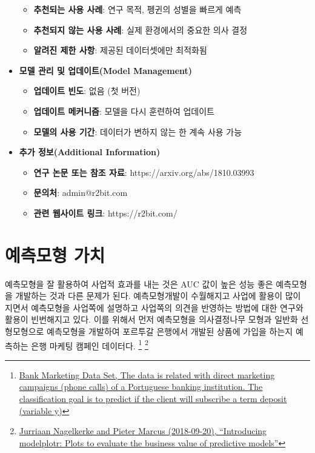 \documentclass[
  letterpaper,
  chapter,a4paper,showtrims,openright,hidelinks]{oblivoir}
\providecommand{\tightlist}{%
  \setlength{\itemsep}{0pt}\setlength{\parskip}{0pt}}\usepackage{longtable,booktabs,array}
\begin{document}
\begin{itemize}
  \begin{itemize}
  \tightlist
  \item
    \textbf{추천되는 사용 사례}: 연구 목적, 펭귄의 성별을 빠르게 예측
  \item
    \textbf{추천되지 않는 사용 사례}: 실제 환경에서의 중요한 의사 결정
  \item
    \textbf{알려진 제한 사항}: 제공된 데이터셋에만 최적화됨
  \end{itemize}
\item
  \textbf{모델 관리 및 업데이트(Model Management)}

  \begin{itemize}
  \tightlist
  \item
    \textbf{업데이트 빈도}: 없음 (첫 버전)
  \item
    \textbf{업데이트 메커니즘}: 모델을 다시 훈련하여 업데이트
  \item
    \textbf{모델의 사용 기간}: 데이터가 변하지 않는 한 계속 사용 가능
  \end{itemize}
\item
  \textbf{추가 정보(Additional Information)}

  \begin{itemize}
  \tightlist
  \item
    \textbf{연구 논문 또는 참조 자료}: https://arxiv.org/abs/1810.03993
  \item
    \textbf{문의처}: admin@r2bit.com
  \item
    \textbf{관련 웹사이트 링크}: https://r2bit.com/
  \end{itemize}
\end{itemize}

\hypertarget{predictive-model}{%
\chapter{예측모형 가치}\label{predictive-model}}

예측모형을 잘 활용하여 사업적 효과를 내는 것은 AUC 값이 높은 성능 좋은
예측모형을 개발하는 것과 다른 문제가 된다. 예측모형개발이 수월해지고
사업에 활용이 많이 지면서 예측모형을 사업쪽에 설명하고 사업쪽의 의견을
반영하는 방법에 대한 연구와 활용이 빈번해지고 있다. 이를 위해서 먼저
예측모형을 의사결정나무 모형과 일반화 선형모형으로 예측모형을 개발하여
포르투갈 은행에서 개발된 상품에 가입을 하는지 예측하는 은행 마케팅
캠페인 데이터다. \footnote{\href{https://archive.ics.uci.edu/ml/datasets/bank+marketing\#}{Bank
  Marketing Data Set, The data is related with direct marketing
  campaigns (phone calls) of a Portuguese banking institution. The
  classification goal is to predict if the client will subscribe a term
  deposit (variable y)}} \footnote{\href{http://api.rpubs.com/jurrr/411810}{Jurriaan
  Nagelkerke and Pieter Marcus (2018-09-20), ``Introducing modelplotr:
  Plots to evaluate the business value of predictive models''}}
\end{document}
